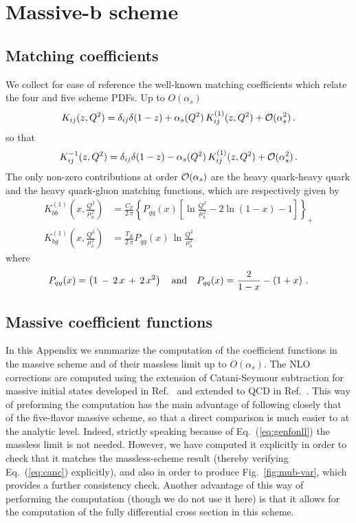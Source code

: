 \chapter{Massive-b scheme}

\section{Matching coefficients}
\label{sec:app-splitting}
We collect for ease of reference the well-known matching coefficients
which relate
the four and five scheme PDFs. Up to $O(\alpha_s)$
\begin{equation}
  K_{ij}(z,Q^2) = \delta_{ij}\delta(1-z) +
  \alpha_s(Q^2)\,K_{ij}^{(1)}(z,Q^2) +{\cal O}(\alpha_s^2)\,.
\end{equation}
so that
\begin{equation}
  K_{ij}^{-1}(z,Q^2) = \delta_{ij}\delta(1-z) -
  \alpha_s(Q^2)\,K_{ij}^{(1)}(z,Q^2) +{\cal O}(\alpha_s^2)\,.
\end{equation}
The only non-zero contributions at order ${\cal O}(\alpha_s)$
are the heavy quark-heavy quark and the heavy quark-gluon
matching functions, which are respectively given by
\begin{equation}
  \label{eq:ks}
  \begin{split}
    K_{bb}^{(1)}\left(x,\frac{Q^2}{\mu_b^2}\right) & = \frac{C_F}{2\,\pi}{\left\{P_{qq}(x)\left[
          \ln{\frac{Q^2}{\mu_b^2}} -2\ln(1-x)-1 \right] \right\}}_{+} \\
    K_{bg}^{(1)}\left(x,\frac{Q^2}{\mu_b^2}\right) & = \frac{T_R}{2\,\pi}
    P_{qg}(x)\,\ln{\frac{Q^2}{\mu_b^2}}
  \end{split}
\end{equation}
where 
\begin{equation}
  P_{qg}(x) = \left(1\,-\,2\,x\,+\,2\,x^2\right)\quad {\rm and }\quad
  P_{qq}(x) = \frac{2}{1-x} -\left( 1+x \right)\,.
\end{equation}

\section{Massive coefficient functions}
\label{sec:app-coeff}
In this Appendix we summarize  the computation of the
coefficient functions in the massive scheme and of their massless
limit up to $O(\alpha_s)$. The NLO corrections are computed using
the extension of
Catani-Seymour subtraction for massive initial states developed
in Ref.~\cite{Dittmaier:1999mb} and extended to QCD
in Ref.~\cite{Krauss:2017wmx}. This way of preforming the computation 
has the main advantage of following closely that of the
five-flavor massive scheme, so that a direct comparison is much easier to
at the analytic level. Indeed, strictly speaking because of
Eq.~(\ref{eq:genfonll}) the massless limit is not needed. However, we
have computed it explicitly in order to check that it matches the
massless-scheme result (thereby verifying Eq.~(\ref{eq:canc})
explicitly), and also in order to produce Fig.~\ref{fig:mub-var},
which provides a further consistency check. Another advantage of this
way of performing the computation (though we do not use it here) is
that it allows for the computation of
the fully differential cross section in this scheme. 

